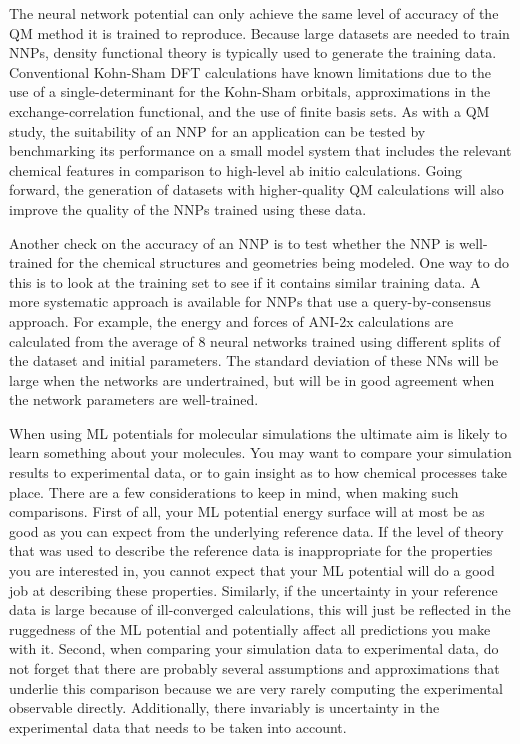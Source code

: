 \documentclass[9pt,bestpractices]{livecoms}
\begin{document}
The neural network potential can only achieve the same level of accuracy of the QM method it is trained to reproduce. Because large datasets are needed to train NNPs, density functional theory is typically used to generate the training data. Conventional Kohn-Sham DFT calculations have known limitations due to the use of a single-determinant for the Kohn-Sham orbitals, approximations in the exchange-correlation functional, and the use of finite basis sets. As with a QM study, the suitability of an NNP for an application can be tested by benchmarking its performance on a small model system that includes the relevant chemical features in comparison to high-level ab initio calculations. Going forward, the generation of datasets with higher-quality QM calculations will also improve the quality of the NNPs trained using these data.

Another check on the accuracy of an NNP is to test whether the NNP is well-trained for the chemical structures and geometries being modeled. One way to do this is to look at the training set to see if it contains similar training data. A more systematic approach is available for NNPs that use a query-by-consensus approach. For example, the energy and forces of ANI-2x calculations are calculated from the average of 8 neural networks trained using different splits of the dataset and initial parameters. The standard deviation of these NNs will be large when the networks are undertrained, but will be in good agreement when the network parameters are well-trained.





When using ML potentials for molecular simulations the ultimate aim is likely to learn something about your molecules. You may want to compare your simulation results to experimental data, or to gain insight as to how chemical processes take place. There are a few considerations to keep in mind, when making such comparisons.
First of all, your ML potential energy surface will at most be as good as you can expect from the underlying reference data. If the level of theory that was used to describe the reference data is inappropriate for the properties you are interested in, you cannot expect that your ML potential will do a good job at describing these properties. Similarly, if the uncertainty in your reference data is large because of ill-converged calculations, this will just be reflected in the ruggedness of the ML potential and potentially affect all predictions you make with it. 
Second, when comparing your simulation data to experimental data, do not forget that there are probably several assumptions and approximations that underlie this comparison because we are very rarely computing the experimental observable directly. Additionally, there invariably is uncertainty in the experimental data that needs to be taken into account\cite{vanGunsteren2017}. 
\end{document}
